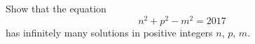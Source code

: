 Show that the equation
\[
n^2+p^2-m^2=2017
\]
has infinitely many solutions in positive integers $n$, $p$, $m$.
